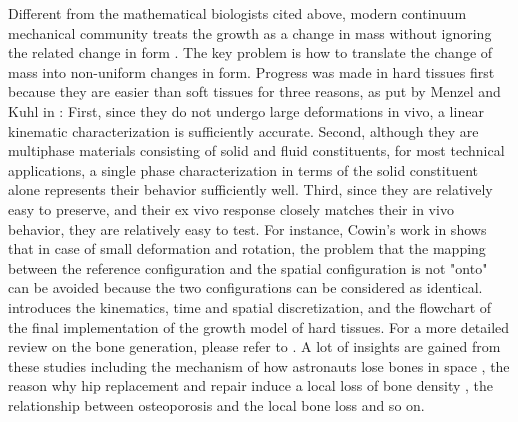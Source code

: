 Different from the mathematical biologists cited above, modern continuum mechanical community treats the growth as a change in mass without ignoring the related change in form \cite{Ambrosi}. The key problem is how to translate the change of mass into non-uniform changes in form. Progress was made in hard tissues first because they are easier than soft tissues for three reasons, as put by Menzel and Kuhl in \cite{Menzel}: First, since they do not undergo large deformations in vivo, a linear kinematic characterization is sufficiently accurate.  Second, although they are multiphase materials consisting of solid and fluid constituents, for most technical applications, a single phase characterization in terms of the solid constituent alone represents their behavior sufficiently well. Third, since they are relatively easy to preserve, and their ex vivo response closely matches their in vivo behavior, they are relatively easy to test. For instance, Cowin's work in \cite{Cowin} shows that in case of small deformation and rotation, the problem that the mapping between the reference configuration and the spatial configuration is not "onto" can be avoided because the two configurations can be considered as identical. \cite{Kuhl} introduces the kinematics, time and spatial discretization, and the flowchart of the final implementation of the growth model of hard tissues. For a more detailed review on the bone generation, please refer to \cite{Isaksson}. A lot of insights are gained from these studies including the mechanism of how astronauts lose bones in space \cite{Kuhl2}, the reason why hip replacement and repair induce a local loss of bone density \cite{Ambrosi}, the relationship between osteoporosis and the local bone loss \cite{Pang} and so on.

